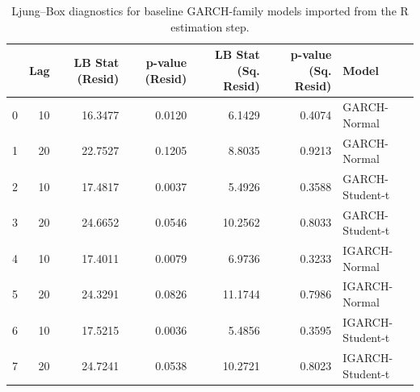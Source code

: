\begin{table}
\caption{Ljung--Box diagnostics for baseline GARCH-family models imported from the R estimation step.}
\label{tab:garch_baseline_diagnostics}
\begin{tabular}{lrrrrrl}
\toprule
 & Lag & LB Stat (Resid) & p-value (Resid) & LB Stat (Sq. Resid) & p-value (Sq. Resid) & Model \\
\midrule
0 & 10 & 16.3477 & 0.0120 & 6.1429 & 0.4074 & GARCH-Normal \\
1 & 20 & 22.7527 & 0.1205 & 8.8035 & 0.9213 & GARCH-Normal \\
2 & 10 & 17.4817 & 0.0037 & 5.4926 & 0.3588 & GARCH-Student-t \\
3 & 20 & 24.6652 & 0.0546 & 10.2562 & 0.8033 & GARCH-Student-t \\
4 & 10 & 17.4011 & 0.0079 & 6.9736 & 0.3233 & IGARCH-Normal \\
5 & 20 & 24.3291 & 0.0826 & 11.1744 & 0.7986 & IGARCH-Normal \\
6 & 10 & 17.5215 & 0.0036 & 5.4856 & 0.3595 & IGARCH-Student-t \\
7 & 20 & 24.7241 & 0.0538 & 10.2721 & 0.8023 & IGARCH-Student-t \\
\bottomrule
\end{tabular}
\end{table}
